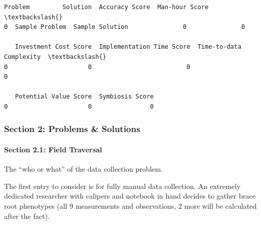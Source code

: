 \documentclass[11pt]{article}
\begin{document}
    
    \begin{Verbatim}[commandchars=\\\{\}]
          Problem         Solution  Accuracy Score  Man-hour Score  \textbackslash{}
0  Sample Problem  Sample Solution               0               0   

   Investment Cost Score  Implementation Time Score  Time-to-data Complexity  \textbackslash{}
0                      0                          0                        0   

   Potential Value Score  Symbiosis Score  
0                      0                0  
    \end{Verbatim}

    
    \hypertarget{section-2-problems-solutions}{%
\subsubsection{Section 2: Problems \&
Solutions}\label{section-2-problems-solutions}}

\hypertarget{section-2.1-field-traversal}{%
\paragraph{Section 2.1: Field
Traversal}\label{section-2.1-field-traversal}}

The ``who or what'' of the data collection problem.

The first entry to consider is for fully manual data collection. An
extremely dedicated researcher with calipers and notebook in hand
decides to gather brace root phenotypes (all 9 measurements and
observations, 2 more will be calculated after the fact).
\end{document}
